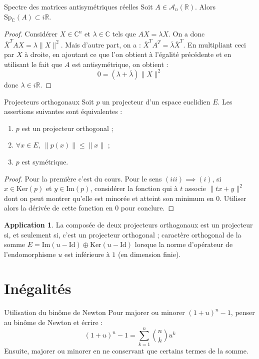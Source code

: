 \documentclass[french]{article}
\newcommand{\R}{\mathbb{R}}
\newcommand{\C}{\mathbb{C}}
\renewcommand{\ker}{\text{Ker}}
\theoremstyle{definition}
\newtheorem*{app}{Application}
\begin{document}
\begin{lem}{Spectre des matrices antisymétriques réelles}
	Soit $A\in\mathcal{A}_n(\R)$. Alors $\text{Sp}_\C(A)\subset i\R$.
\end{lem}
\begin{proof}
	Considérer $X\in\C^n$ et $\lambda\in\C$ tels que $AX=\lambda X$. On a donc $\overline{X}^TAX=\lambda\lVert X\rVert^2$. Mais d'autre part, on a : $\overline{X}^TA^T=\overline{\lambda}\overline{X}^T$. En multipliant ceci par $X$ à droite, en ajoutant ce que l'on obtient à l'égalité précédente et en utilisant le fait que $A$ est antisymétrique, on obtient : $$0=(\lambda+\overline{\lambda})\lVert X\rVert^2$$ donc $\lambda\in i\R$.
\end{proof}

\begin{lem}{Projecteurs orthogonaux}
	Soit $p$ un projecteur d'un espace euclidien $E$. Les assertions suivantes sont équivalentes :
	\begin{enumerate}[label=(\roman*)]
		\item $p$ est un projecteur orthogonal ;
		\item $\forall x\in E,\ \lVert p(x)\rVert\leqslant\lVert x\rVert$ ;
		\item $p$ est symétrique.
	\end{enumerate}
\end{lem}
\begin{proof}
	Pour la première c'est du cours. Pour le sens $(iii)\implies (i)$, si $x\in\ker(p)$ et $y\in\text{Im}(p)$, considérer la fonction qui à $t$ associe $\lVert tx+y\rVert^2$ dont on peut montrer qu'elle est minorée et atteint son minimum en $0$. Utiliser alors la dérivée de cette fonction en $0$ pour conclure.
\end{proof}
\begin{app}
	La composée de deux projecteurs orthogonaux est un projecteur si, et seulement si, c'est un projecteur orthogonal ; caractère orthogonal de la somme $E=\text{Im}(u-\text{Id})\oplus\ker(u-\text{Id})$ lorsque la norme d'opérateur de l'endomorphisme $u$ est inférieure à $1$ (en dimension finie).
\end{app}

\section{Inégalités}

\begin{lem}{Utilisation du binôme de Newton} Pour majorer ou minorer $(1+u)^n-1$, penser au binôme de Newton et écrire : $$(1+u)^n-1=\sum_{k=1}^{n}\binom{n}{k}u^k$$ Ensuite, majorer ou minorer en ne conservant que certains termes de la somme.
\end{lem}
\end{document}
